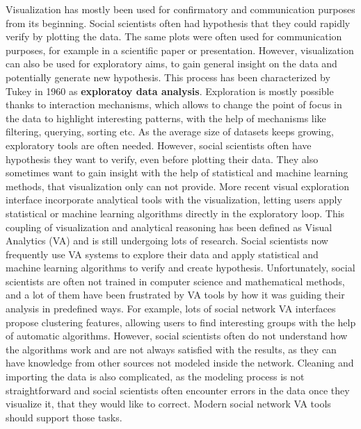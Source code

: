 Visualization has mostly been used for confirmatory and communication purposes from its beginning.
Social scientists often had hypothesis that they could rapidly verify by plotting the data.
The same plots were often used for communication purposes, for example in a scientific paper or presentation.
However, visualization can also be used for exploratory aims, to gain general insight on the data and potentially generate new hypothesis.
This process has been characterized by Tukey in 1960 as \textbf{exploratoy data analysis}.
Exploration is mostly possible thanks to interaction mechanisms, which allows to change the point of focus in the data to highlight interesting patterns, with the help of mechanisms like filtering, querying, sorting etc.
As the average size of datasets keeps growing, exploratory tools are often needed.
However, social scientists often have hypothesis they want to verify, even before plotting their data.
They also sometimes want to gain insight with the help of statistical and machine learning methods, that visualization only can not provide.
More recent visual exploration interface incorporate analytical tools with the visualization, letting users apply statistical or machine learning algorithms directly in the exploratory loop.
This coupling of visualization and analytical reasoning has been defined as Visual Analytics (VA) and is still undergoing lots of research.
Social scientists now frequently use VA systems to explore their data and apply statistical and machine learning algorithms to verify and create hypothesis.
Unfortunately, social scientists are often not trained in computer science and mathematical methods, and a lot of them have been frustrated by VA tools by how it was guiding their analysis in predefined ways.
For example, lots of social network VA interfaces propose clustering features, allowing users to find interesting groups with the help of automatic algorithms.
However, social scientists often do not understand how the algorithms work and are not always satisfied with the results, as they can have knowledge from other sources not modeled inside the network.
Cleaning and importing the data is also complicated, as the modeling process is not straightforward and social scientists often encounter errors in the data once they visualize it, that they would like to correct.
Modern social network VA tools should support those tasks.




